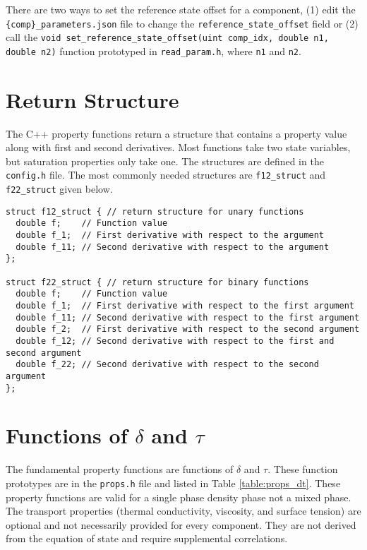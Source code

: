 \documentclass[oneside]{book}
\begin{document}
There are two ways to set the reference state offset for a component, (1) edit the \texttt{\{comp\}\_parameters.json} file to change the \texttt{reference\_state\_offset} field or (2) call the   
\texttt{void set\_reference\_state\_offset(uint comp\_idx, double n1, double n2)} function prototyped in \texttt{read\_param.h}, where \texttt{n1} and \texttt{n2}.

\section{Return Structure}

The C++ property functions return a structure that contains a property value along with first and second derivatives.  Most functions take two state variables, but saturation properties only take one.  The structures are defined in the \texttt{config.h} file. The most commonly needed structures are \texttt{f12\_struct} and \texttt{f22\_struct} given below.

\begin{verbatim}
struct f12_struct { // return structure for unary functions
  double f;    // Function value
  double f_1;  // First derivative with respect to the argument
  double f_11; // Second derivative with respect to the argument
};

struct f22_struct { // return structure for binary functions
  double f;    // Function value
  double f_1;  // First derivative with respect to the first argument
  double f_11; // Second derivative with respect to the first argument
  double f_2;  // First derivative with respect to the second argument
  double f_12; // Second derivative with respect to the first and second argument
  double f_22; // Second derivative with respect to the second argument
};
\end{verbatim}

\section{Functions of $\delta$ and $\tau$}

The fundamental property functions are functions of $\delta$ and $\tau$.  These function prototypes are in the \texttt{props.h} file and listed in Table \ref{table:props_dt}.  These property functions are valid for a single phase density phase not a mixed phase. The transport properties (thermal conductivity, viscosity, and surface tension) are optional and not necessarily provided for every component.  They are not derived from the equation of state and require supplemental correlations.  
\end{document}
